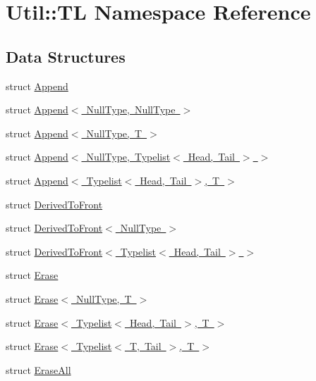 \hypertarget{namespaceUtil_1_1TL}{}\section{Util\+:\+:TL Namespace Reference}
\label{namespaceUtil_1_1TL}
\subsection*{Data Structures}
\begin{DoxyCompactItemize}
\item 
struct \mbox{\hyperlink{structUtil_1_1TL_1_1Append}{Append}}
\item 
struct \mbox{\hyperlink{structUtil_1_1TL_1_1Append_3_01NullType_00_01NullType_01_4}{Append$<$ Null\+Type, Null\+Type $>$}}
\item 
struct \mbox{\hyperlink{structUtil_1_1TL_1_1Append_3_01NullType_00_01T_01_4}{Append$<$ Null\+Type, T $>$}}
\item 
struct \mbox{\hyperlink{structUtil_1_1TL_1_1Append_3_01NullType_00_01Typelist_3_01Head_00_01Tail_01_4_01_4}{Append$<$ Null\+Type, Typelist$<$ Head, Tail $>$ $>$}}
\item 
struct \mbox{\hyperlink{structUtil_1_1TL_1_1Append_3_01Typelist_3_01Head_00_01Tail_01_4_00_01T_01_4}{Append$<$ Typelist$<$ Head, Tail $>$, T $>$}}
\item 
struct \mbox{\hyperlink{structUtil_1_1TL_1_1DerivedToFront}{Derived\+To\+Front}}
\item 
struct \mbox{\hyperlink{structUtil_1_1TL_1_1DerivedToFront_3_01NullType_01_4}{Derived\+To\+Front$<$ Null\+Type $>$}}
\item 
struct \mbox{\hyperlink{structUtil_1_1TL_1_1DerivedToFront_3_01Typelist_3_01Head_00_01Tail_01_4_01_4}{Derived\+To\+Front$<$ Typelist$<$ Head, Tail $>$ $>$}}
\item 
struct \mbox{\hyperlink{structUtil_1_1TL_1_1Erase}{Erase}}
\item 
struct \mbox{\hyperlink{structUtil_1_1TL_1_1Erase_3_01NullType_00_01T_01_4}{Erase$<$ Null\+Type, T $>$}}
\item 
struct \mbox{\hyperlink{structUtil_1_1TL_1_1Erase_3_01Typelist_3_01Head_00_01Tail_01_4_00_01T_01_4}{Erase$<$ Typelist$<$ Head, Tail $>$, T $>$}}
\item 
struct \mbox{\hyperlink{structUtil_1_1TL_1_1Erase_3_01Typelist_3_01T_00_01Tail_01_4_00_01T_01_4}{Erase$<$ Typelist$<$ T, Tail $>$, T $>$}}
\item 
struct \mbox{\hyperlink{structUtil_1_1TL_1_1EraseAll}{Erase\+All}}

\end{DoxyCompactItemize}
